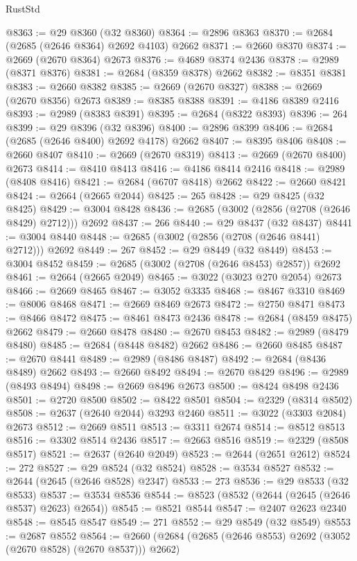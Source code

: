 \begin{lexlean}{RustStd}
\begin{coremodule}
@8363 := @29 @8360 (@32 @8360)
@8364 := @2896 @8363
@8370 := @2684 (@2685 (@2646 @8364) @2692 @4103) @2662
@8371 := @2660 @8370
@8374 := @2669 (@2670 @8364) @2673
@8376 := @4689 @8374 @2436
@8378 := @2989 (@8371 @8376)
@8381 := @2684 (@8359 @8378) @2662
@8382 := @8351 @8381
@8383 := @2660 @8382
@8385 := @2669 (@2670 @8327)
@8388 := @2669 (@2670 @8356) @2673
@8389 := @8385 @8388
@8391 := @4186 @8389 @2416
@8393 := @2989 (@8383 @8391)
@8395 := @2684 (@8322 @8393)
@8396 := 264
@8399 := @29 @8396 (@32 @8396)
@8400 := @2896 @8399
@8406 := @2684 (@2685 (@2646 @8400) @2692 @4178) @2662
@8407 := @8395 @8406
@8408 := @2660 @8407
@8410 := @2669 (@2670 @8319)
@8413 := @2669 (@2670 @8400) @2673
@8414 := @8410 @8413
@8416 := @4186 @8414 @2416
@8418 := @2989 (@8408 @8416)
@8421 := @2684 (@6707 @8418) @2662
@8422 := @2660 @8421
@8424 := @2664 (@2665 @2044)
@8425 := 265
@8428 := @29 @8425 (@32 @8425)
@8429 := @3004 @8428
@8436 := @2685 (@3002 (@2856 (@2708 (@2646 @8429) @2712))) @2692
@8437 := 266
@8440 := @29 @8437 (@32 @8437)
@8441 := @3004 @8440
@8448 := @2685 (@3002 (@2856 (@2708 (@2646 @8441) @2712))) @2692
@8449 := 267
@8452 := @29 @8449 (@32 @8449)
@8453 := @3004 @8452
@8459 := @2685 (@3002 (@2708 (@2646 @8453) @2857)) @2692
@8461 := @2664 (@2665 @2049)
@8465 := @3022 (@3023 @270 @2054) @2673
@8466 := @2669 @8465
@8467 := @3052 @3335
@8468 := @8467 @3310
@8469 := @8006 @8468
@8471 := @2669 @8469 @2673
@8472 := @2750 @8471
@8473 := @8466 @8472
@8475 := @8461 @8473 @2436
@8478 := @2684 (@8459 @8475) @2662
@8479 := @2660 @8478
@8480 := @2670 @8453
@8482 := @2989 (@8479 @8480)
@8485 := @2684 (@8448 @8482) @2662
@8486 := @2660 @8485
@8487 := @2670 @8441
@8489 := @2989 (@8486 @8487)
@8492 := @2684 (@8436 @8489) @2662
@8493 := @2660 @8492
@8494 := @2670 @8429
@8496 := @2989 (@8493 @8494)
@8498 := @2669 @8496 @2673
@8500 := @8424 @8498 @2436
@8501 := @2720 @8500
@8502 := @8422 @8501
@8504 := @2329 (@8314 @8502)
@8508 := @2637 (@2640 @2044) @3293 @2460
@8511 := @3022 (@3303 @2084) @2673
@8512 := @2669 @8511
@8513 := @3311 @2674
@8514 := @8512 @8513
@8516 := @3302 @8514 @2436
@8517 := @2663 @8516
@8519 := @2329 (@8508 @8517)
@8521 := @2637 (@2640 @2049)
@8523 := @2644 (@2651 @2612)
@8524 := 272
@8527 := @29 @8524 (@32 @8524)
@8528 := @3534 @8527
@8532 := @2644 (@2645 (@2646 @8528) @2347)
@8533 := 273
@8536 := @29 @8533 (@32 @8533)
@8537 := @3534 @8536
@8544 := @8523 (@8532 (@2644 (@2645 (@2646 @8537) @2623) @2654))
@8545 := @8521 @8544
@8547 := @2407 @2623 @2340
@8548 := @8545 @8547
@8549 := 271
@8552 := @29 @8549 (@32 @8549)
@8553 := @2687 @8552
@8564 := @2660 (@2684 (@2685 (@2646 @8553) @2692 (@3052 (@2670 @8528) (@2670 @8537))) @2662)

\end{coremodule}
\end{lexlean}
